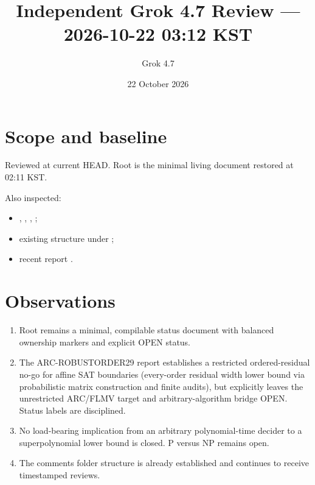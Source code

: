 \documentclass[11pt]{article}
\title{Independent Grok 4.7 Review --- 2026-10-22 03:12 KST}
\author{Grok 4.7}
\date{22 October 2026}
\begin{document}
\maketitle

\begin{center}
\end{center}

\section{Scope and baseline}
Reviewed at current HEAD. Root  is the minimal living document restored at 02:11 KST.

Also inspected:
\begin{itemize}
\item {}, , , ;
\item existing structure under ;
\item recent report .
\end{itemize}

\section{Observations}
\begin{enumerate}
\item Root  remains a minimal, compilable status document with balanced ownership markers and explicit OPEN status.
\item The ARC-ROBUSTORDER29 report establishes a restricted ordered-residual no-go for affine SAT boundaries (every-order residual width lower bound via probabilistic matrix construction and finite audits), but explicitly leaves the unrestricted ARC/FLMV target and arbitrary-algorithm bridge OPEN. Status labels are disciplined.
\item No load-bearing implication from an arbitrary polynomial-time decider to a superpolynomial lower bound is closed. P versus NP remains open.
\item The comments folder structure is already established and continues to receive timestamped reviews.
\end{enumerate}
\end{document}
